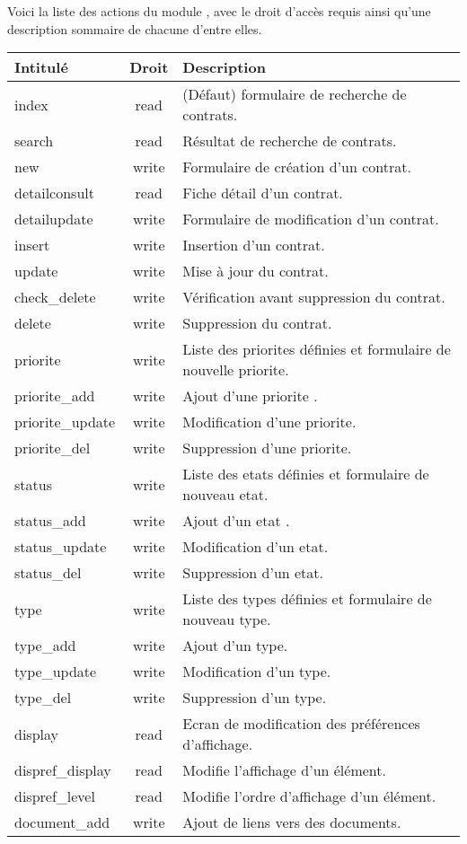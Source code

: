 Voici la liste des actions du module \contract, avec le droit d'accès requis ainsi qu'une description sommaire de chacune d'entre elles.\\

\begin{tabular}{|l|c|p{9.5cm}|}
 \hline
 \textbf{Intitulé} & \textbf{Droit} & \textbf{Description} \\
 \hline
 \hline
  index & read & (Défaut) formulaire de recherche de contrats. \\ 
 \hline
  search & read & Résultat de recherche de contrats. \\
 \hline
  new & write & Formulaire de création d'un contrat. \\
 \hline
  detailconsult & read & Fiche détail d'un contrat. \\
 \hline
  detailupdate & write & Formulaire de modification d'un contrat. \\
 \hline
  insert & write & Insertion d'un contrat. \\
 \hline
  update & write & Mise à jour du contrat. \\
 \hline
  check\_delete & write & Vérification avant suppression du contrat. \\
 \hline
  delete & write & Suppression du contrat. \\
 \hline
  priorite & write & Liste des priorites définies et formulaire de nouvelle priorite. \\
 \hline
  priorite\_add & write & Ajout d'une priorite . \\
 \hline
  priorite\_update & write & Modification d'une priorite. \\
 \hline
  priorite\_del & write & Suppression d'une priorite. \\
 \hline
  status & write & Liste des etats définies et formulaire de nouveau etat. \\
 \hline
  status\_add & write & Ajout d'un etat . \\
 \hline
  status\_update & write & Modification d'un etat. \\
 \hline
  status\_del & write & Suppression d'un etat. \\
 \hline
  type & write & Liste des types définies et formulaire de nouveau type. \\
 \hline
  type\_add & write & Ajout d'un type. \\
 \hline
  type\_update & write & Modification d'un type. \\
 \hline
  type\_del & write & Suppression d'un type. \\
 \hline
  display & read & Ecran de modification des préférences d'affichage. \\
 \hline
  dispref\_display & read & Modifie l'affichage d'un élément. \\
 \hline
  dispref\_level & read & Modifie l'ordre d'affichage d'un élément. \\
 \hline
  document\_add & write & Ajout de liens vers des documents. \\
 \hline
\end{tabular}


